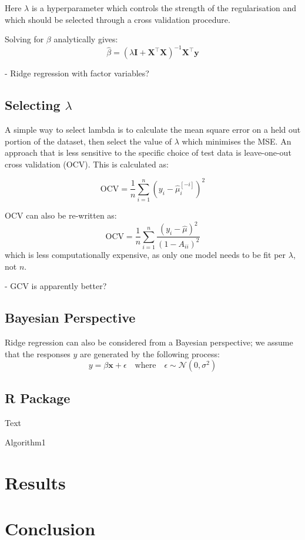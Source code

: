 \documentclass[11pt,a4paper]{article}
\begin{document}
Here $\lambda$ is a hyperparameter which controls the strength of the regularisation and which should be selected through a cross validation procedure. 

Solving for $\beta$ analytically gives: 
$$\hat{\beta} = (\lambda \textbf{I} + \textbf{X}^{\top} \textbf{X})^{-1} \textbf{X}^{\top}\textbf{y}$$

 
- Ridge regression with factor variables?


\subsection{Selecting \texorpdfstring{$\lambda$}{l}}
A simple way to select lambda is to calculate the mean square error on a held out portion of the dataset, then select the value of $\lambda$ which minimises the MSE. An approach that is less sensitive to the specific choice of test data is leave-one-out cross validation (OCV). This is calculated as:

$$\text{OCV} = \frac{1}{n} \sum_{i=1}^n \left( y_i - \hat{\mu}_i^{[-i]} \right)^2$$

OCV can also be re-written as:
$$\text{OCV} = \frac{1}{n} \sum_{i=1}^n \frac{(y_i - \hat{\mu})^2}{(1-A_{ii})^2}$$
which is less computationally expensive, as only one model needs to be fit per $\lambda$, not $n$.

- GCV is apparently better?
 
\subsection{Bayesian Perspective}
Ridge regression can also be considered from a Bayesian perspective; we assume that the responses $y$ are generated by the following process:
$$y = \beta \textbf{x} + \epsilon \quad \text{where} \quad \epsilon \sim \mathcal{N}(0, \sigma^2)$$

 

\subsection{R Package} 


\begin{algorithm}[H] \label{alg1}
\DontPrintSemicolon
\SetAlgoLined
{}
Text\;
\caption{Algorithm1}
\end{algorithm}


\section{Results}

\section{Conclusion}

%
%

\end{document}
